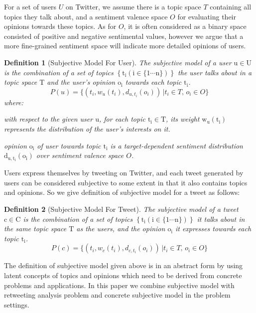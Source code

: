 \documentclass{acm_proc_article-sp}
\newtheorem{definition}{Definition}
\begin{document}
For a set of users $U$ on Twitter, we assume there is a topic space $T$ containing all topics they talk about, and a sentiment valence space $O$ for evaluating their opinions towards these topics. As for $O$, it is often considered as a binary space consisted of positive and negative sentimental values, however we argue that a more fine-grained sentiment space will indicate more detailed opinions of users. 
\begin{definition}[Subjective Model For User]
The subjective model of a user $\mathrm{u \in U}$ is the combination of a set of topics $\left\lbrace  \mathrm{t_{i} \left( i \in \lbrace1 \cdots n \rbrace \right) } \right\rbrace $ the user talks about in a topic space $\mathrm{T}$ and the user's opinion $\mathrm{o_{i}}$ towards each topic $ \mathrm{t_{i}} $. 
\begin{equation}
\label{usermodel}
P \left( u \right) = \lbrace \left( t_{i}, w_{u} \left( t_{i} \right), d_{u,t_{i}} \left( o_{i} \right) \right) \,\vert  t_{i} \in T, \, o_{i} \in O \rbrace
\end{equation}
where:
\begin{itemize*}
\item with respect to the given user $\mathrm{u}$,  for each topic $\mathrm{t_{i} \in T}$, its  weight $\mathrm{ w_{u} \left( t_{i} \right)}$ represents the distribution of the user's interests on it.
\item opinion $\mathrm{o_{i}}$ of user towards topic $\mathrm{t_{i}}$ is a target-dependent sentiment distribution  $\mathrm{d_{u,t_{i}} \left( o_{i} \right)}$ over sentiment valence space $O$.
\end{itemize*}
\end{definition}
Users express themselves by tweeting on Twitter, and each tweet generated by users can be considered subjective to some extent in that it also contains topics and opinions. So we give definition of subjective model for a tweet as follows:
\begin{definition}[Subjective Model For Tweet]  
The subjective model of a tweet $\mathrm{c \in C}$ is the combination of a set of topics $\left\lbrace \mathrm{t_{i} \left( i \in \lbrace1 \cdots n \rbrace \right) } \right\rbrace$ it talks about in the same topic space $\mathrm{T}$ as the users, and the opinion $\mathrm{o_{i}}$ it expresses towards each topic $ \mathrm{t_{i}} $.
\begin{equation}
\label{tweetmodel}
P \left( c \right) = \lbrace \left( t_{i}, w_{c} \left( t_{i} \right), d_{c,t_{i}} \left( o_{i} \right) \right) \,\vert  t_{i} \in T, \, o_{i} \in O \rbrace
\end{equation}
\end{definition}
The definition of subjective model given above is in an abstract form by using latent concepts of topics and opinions which need to be derived from concrete problems and applications. In this paper we combine subjective model with retweeting analysis problem and concrete subjective model in the problem settings.  
\end{document}

